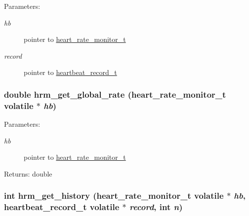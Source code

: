 \begin{Desc}
\item[Parameters:]
\begin{description}
\item[{\em hb}]pointer to \hyperlink{structheart__rate__monitor__t}{heart\_\-rate\_\-monitor\_\-t} \item[{\em record}]pointer to \hyperlink{structheartbeat__record__t}{heartbeat\_\-record\_\-t} \end{description}
\end{Desc}
\hypertarget{heart__rate__monitor-shared_8c_ddc73b92ee482b42aa7a91ea5fc3672c}{
\subsubsection[hrm\_\-get\_\-global\_\-rate]{\setlength{\rightskip}{0pt plus 5cm}double hrm\_\-get\_\-global\_\-rate ({\bf heart\_\-rate\_\-monitor\_\-t} volatile $\ast$ {\em hb})}}
\label{heart__rate__monitor-shared_8c_ddc73b92ee482b42aa7a91ea5fc3672c}


\begin{Desc}
\item[Parameters:]
\begin{description}
\item[{\em hb}]pointer to \hyperlink{structheart__rate__monitor__t}{heart\_\-rate\_\-monitor\_\-t} \end{description}
\end{Desc}
\begin{Desc}
\item[Returns:]double \end{Desc}
\hypertarget{heart__rate__monitor-shared_8c_9e7614bee97e7db3cb4e7e4b78c94337}{
\subsubsection[hrm\_\-get\_\-history]{\setlength{\rightskip}{0pt plus 5cm}int hrm\_\-get\_\-history ({\bf heart\_\-rate\_\-monitor\_\-t} volatile $\ast$ {\em hb}, \/  {\bf heartbeat\_\-record\_\-t} volatile $\ast$ {\em record}, \/  int {\em n})}}
\label{heart__rate__monitor-shared_8c_9e7614bee97e7db3cb4e7e4b78c94337}


